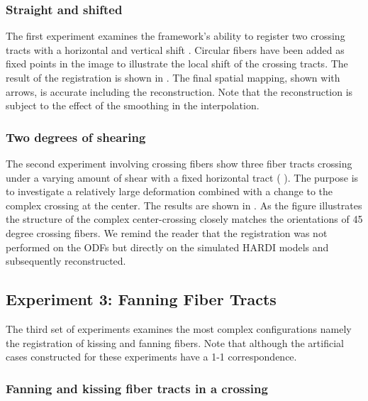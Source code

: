 \documentclass[twocolumn]{svjour3}
\begin{document}
\subsubsection{Straight and shifted}

The first experiment examines the framework's ability to register two crossing tracts with
a horizontal and vertical shift
. Circular fibers have been added
as fixed points in the image to illustrate the local shift of the crossing tracts. The
result of the registration is shown in
. The final spatial mapping,
shown with arrows, is accurate including the reconstruction. Note that the reconstruction
is subject to the effect of the smoothing in the interpolation.

\subsubsection{Two degrees of shearing}

The second experiment involving crossing fibers show three fiber tracts crossing under a
varying amount of shear with a fixed horizontal tract (
). The purpose is to investigate a relatively
large deformation combined with a change to the complex crossing at the center. The
results are shown in . As the figure
illustrates the structure of the complex center-crossing closely matches the orientations
of 45 degree crossing fibers. We remind the reader that the registration was not performed
on the ODFs but directly on the simulated HARDI models and subsequently reconstructed.

\subsection{Experiment 3: Fanning Fiber Tracts}
\label{subsec:kissingfiber}

The third set of experiments examines the most complex configurations namely the
registration of kissing and fanning fibers. Note that although the artificial cases
constructed for these experiments have a 1-1 correspondence.

\subsubsection{Fanning and kissing fiber tracts in a crossing}
\end{document}
